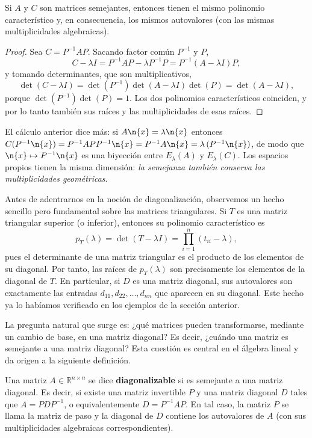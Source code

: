 \begin{thm}
Si $A$ y $C$ son matrices semejantes, entonces tienen el mismo polinomio característico y, en consecuencia, los mismos autovalores (con las mismas multiplicidades algebraicas).
\end{thm}
\begin{proof}
Sea $C=P^{-1}AP$. Sacando factor común $P^{-1}$ y $P$,
\[
C-\lambda I = P^{-1}AP-\lambda P^{-1}P = P^{-1}(A-\lambda I)P ,
\]
y tomando determinantes, que son multiplicativos,
\[
\det(C-\lambda I)=\det(P^{-1})\det(A-\lambda I)\det(P)=\det(A-\lambda I),
\]
porque $\det(P^{-1})\det(P)=1$. Los dos polinomios característicos coinciden, y por lo
tanto también sus raíces y las multiplicidades de esas raíces.
\end{proof}

\begin{remark}
El cálculo anterior dice más: si $A\n{x}=\lambda\n{x}$ entonces
$C(P^{-1}\n{x})=P^{-1}AP P^{-1}\n{x}=P^{-1}A\n{x}=\lambda\,(P^{-1}\n{x})$, de modo que
$\n{x}\mapsto P^{-1}\n{x}$ es una biyección entre $E_\lambda(A)$ y $E_\lambda(C)$. Los
espacios propios tienen la misma dimensión: \emph{la semejanza también conserva las
multiplicidades geométricas}.
\end{remark}


Antes de adentrarnos en la noción de diagonalización, observemos un hecho sencillo pero fundamental sobre las matrices triangulares. Si $T$ es una matriz triangular superior (o inferior), entonces su polinomio característico es
\[
p_T(\lambda) = \det(T - \lambda I) = \prod_{i=1}^n (t_{ii} - \lambda),
\]
pues el determinante de una matriz triangular es el producto de los elementos de su diagonal. Por tanto, las raíces de $p_T(\lambda)$ son precisamente los elementos de la diagonal de $T$. En particular, si $D$ es una matriz diagonal, sus autovalores son exactamente las entradas $d_{11}, d_{22}, \dots, d_{nn}$ que aparecen en su diagonal. Este hecho ya lo habíamos verificado en los ejemplos de la sección anterior.

La pregunta natural que surge es: ¿qué matrices pueden transformarse, mediante un cambio de base, en una matriz diagonal? Es decir, ¿cuándo una matriz es semejante a una matriz diagonal? Esta cuestión es central en el álgebra lineal y da origen a la siguiente definición.

Una matriz $A \in \mathbb{R}^{n\times n}$ se dice \textbf{diagonalizable} si es semejante a una matriz diagonal. Es decir, si existe una matriz invertible $P$ y una matriz diagonal $D$ tales que $A = P D P^{-1}$, o equivalentemente $D = P^{-1} A P$. En tal caso, la matriz $P$ se llama la matriz de paso y la diagonal de $D$ contiene los autovalores de $A$ (con sus multiplicidades algebraicas correspondientes).

